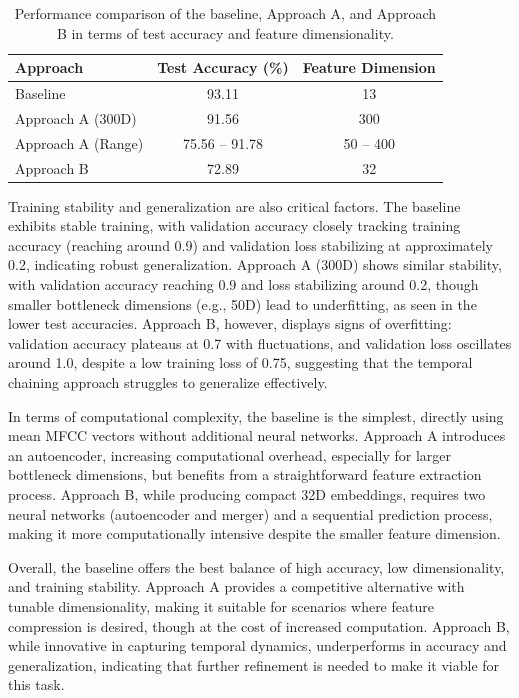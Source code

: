 \documentclass[12pt]{article}
\begin{document}
\begin{table}[h]
    \centering
    \caption{Performance comparison of the baseline, Approach A, and Approach B in terms of test accuracy and feature dimensionality.}
    \label{tab:performance_comparison}
    \begin{tabular}{|l|c|c|}
        \hline
        \textbf{Approach} & \textbf{Test Accuracy (\%)} & \textbf{Feature Dimension} \\
        \hline
        Baseline & 93.11 & 13 \\
        Approach A (300D) & 91.56 & 300 \\
        Approach A (Range) & 75.56 -- 91.78 & 50 -- 400 \\
        Approach B & 72.89 & 32 \\
        \hline
    \end{tabular}
\end{table}

Training stability and generalization are also critical factors. The baseline exhibits stable training, with validation accuracy closely tracking training accuracy (reaching around 0.9) and validation loss stabilizing at approximately 0.2, indicating robust generalization. Approach A (300D) shows similar stability, with validation accuracy reaching 0.9 and loss stabilizing around 0.2, though smaller bottleneck dimensions (e.g., 50D) lead to underfitting, as seen in the lower test accuracies. Approach B, however, displays signs of overfitting: validation accuracy plateaus at 0.7 with fluctuations, and validation loss oscillates around 1.0, despite a low training loss of 0.75, suggesting that the temporal chaining approach struggles to generalize effectively.

In terms of computational complexity, the baseline is the simplest, directly using mean MFCC vectors without additional neural networks. Approach A introduces an autoencoder, increasing computational overhead, especially for larger bottleneck dimensions, but benefits from a straightforward feature extraction process. Approach B, while producing compact 32D embeddings, requires two neural networks (autoencoder and merger) and a sequential prediction process, making it more computationally intensive despite the smaller feature dimension.

Overall, the baseline offers the best balance of high accuracy, low dimensionality, and training stability. Approach A provides a competitive alternative with tunable dimensionality, making it suitable for scenarios where feature compression is desired, though at the cost of increased computation. Approach B, while innovative in capturing temporal dynamics, underperforms in accuracy and generalization, indicating that further refinement is needed to make it viable for this task.
\end{document}
